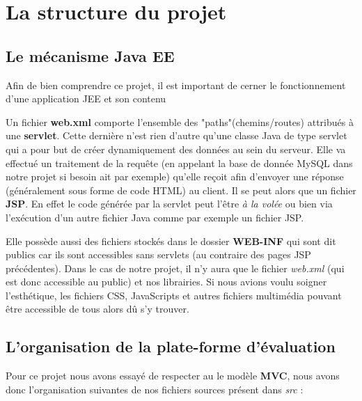 \documentclass[a4paper]{article}
\begin{document}
\section{La structure du projet}
\label{sec:theory}

\subsection{Le mécanisme Java EE}

Afin de bien comprendre ce projet, il est important de cerner le fonctionnement d'une application JEE et son contenu

Un fichier \textbf{web.xml} comporte l'ensemble des "paths"(chemins/routes) attribués à une \textbf{servlet}. Cette dernière n'est rien d'autre qu'une classe Java de type servlet qui a pour but de créer dynamiquement des données au sein du serveur. Elle va effectué un traitement de la requête (en appelant la base de donnée MySQL dans notre projet si besoin ait par exemple) qu'elle reçoit afin d'envoyer une réponse (généralement sous forme de code HTML) au client. Il se peut alors que un fichier \textbf{JSP}. En effet le code générée par la servlet peut l'être \textit{à la volée} ou bien via l'exécution d'un autre fichier Java comme par exemple un fichier JSP.

Elle possède aussi des fichiers stockés dans le dossier \textbf{WEB-INF} qui sont dit publics car ils sont accessibles sans servlets (au contraire des pages JSP précédentes). Dans le cas de notre projet, il n'y aura que le fichier \textit{web.xml} (qui est donc accessible au public) et nos librairies. Si nous avions voulu soigner l'esthétique, les fichiers CSS, JavaScripts et autres fichiers multimédia pouvant être accessible de tous alors dû s'y trouver.

\subsection{L'organisation de la plate-forme d'évaluation}

Pour ce projet nous avons essayé de respecter au le modèle \textbf{MVC}, nous avons donc l'organisation suivantes de nos fichiers sources présent dans \textit{src} : 
\end{document}
